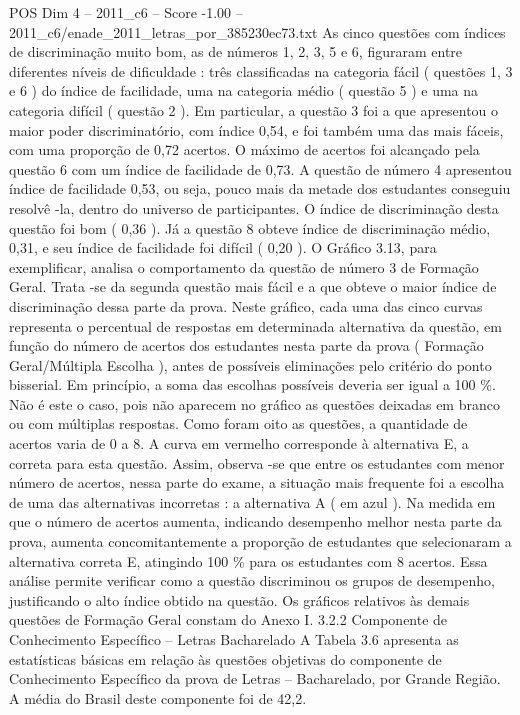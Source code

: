 \begin{textsample}{POS Dim 4 – 2011\_c6 – Score -1.00 – 2011\_c6/enade\_2011\_letras\_por\_385230ec73.txt}
As cinco questões com índices de discriminação muito bom, as de números 1, 2, 3, 5 e 6, figuraram entre diferentes níveis de dificuldade : três classificadas na categoria fácil ( questões 1, 3 e 6 ) do índice de facilidade, uma na categoria médio ( questão 5 ) e uma na categoria difícil ( questão 2 ).
Em particular, a questão 3 foi a que apresentou o maior poder discriminatório, com índice 0,54, e foi também uma das mais fáceis, com uma proporção de 0,72 acertos.
O máximo de acertos foi alcançado pela questão 6 com um índice de facilidade de 0,73.
A questão de número 4 apresentou índice de facilidade 0,53, ou seja, pouco mais da metade dos estudantes conseguiu resolvê -la, dentro do universo de participantes.
O índice de discriminação desta questão foi bom ( 0,36 ).
Já a questão 8 obteve índice de discriminação médio, 0,31, e seu índice de facilidade foi difícil ( 0,20 ).
O Gráfico 3.13, para exemplificar, analisa o comportamento da questão de número 3 de Formação Geral.
Trata -se da segunda questão mais fácil e a que obteve o maior índice de discriminação dessa parte da prova.
Neste gráfico, cada uma das cinco curvas representa o percentual de respostas em determinada alternativa da questão, em função do número de acertos dos estudantes nesta parte da prova ( Formação Geral/Múltipla Escolha ), antes de possíveis eliminações pelo critério do ponto bisserial.
Em princípio, a soma das escolhas possíveis deveria ser igual a 100 \%.
Não é este o caso, pois não aparecem no gráfico as questões deixadas em branco ou com múltiplas respostas.
Como foram oito as questões, a quantidade de acertos varia de 0 a 8.
A curva em vermelho corresponde à alternativa E, a correta para esta questão.
Assim, observa -se que entre os estudantes com menor número de acertos, nessa parte do exame, a situação mais frequente foi a escolha de uma das alternativas incorretas : a alternativa A ( em azul ).
Na medida em que o número de acertos aumenta, indicando desempenho melhor nesta parte da prova, aumenta concomitantemente a proporção de estudantes que selecionaram a alternativa correta E, atingindo 100 \% para os estudantes com 8 acertos.
Essa análise permite verificar como a questão discriminou os grupos de desempenho, justificando o alto índice obtido na questão.
Os gráficos relativos às demais questões de Formação Geral constam do Anexo I. 3.2.2 Componente de Conhecimento Específico – Letras Bacharelado A Tabela 3.6 apresenta as estatísticas básicas em relação às questões objetivas do componente de Conhecimento Específico da prova de Letras – Bacharelado, por Grande Região.
A média do Brasil deste componente foi de 42,2.

\end{textsample}
